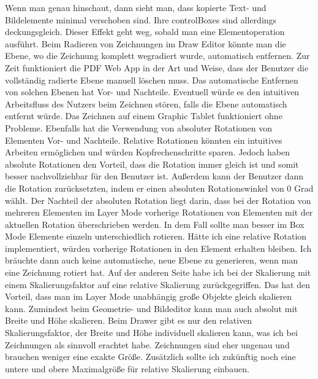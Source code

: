 Wenn man genau hinschaut, dann sieht man, dass kopierte Text- und Bildelemente minimal verschoben sind. Ihre controlBoxes sind allerdings deckungsgleich. Dieser Effekt geht weg, sobald man eine Elementoperation ausführt. Beim Radieren von Zeichnungen im Draw Editor könnte man die Ebene, wo die Zeichnung komplett wegradiert wurde, automatisch entfernen. Zur Zeit funktioniert die PDF Web App in der Art und Weise, dass der Benutzer die vollständig radierte Ebene manuell löschen muss. Das automatische Entfernen von solchen Ebenen hat Vor- und Nachteile. Eventuell würde es den intuitiven Arbeitsfluss des Nutzers beim Zeichnen stören, falls die Ebene automatisch entfernt würde. Das Zeichnen auf einem Graphic Tablet funktioniert ohne Probleme. Ebenfalls hat die Verwendung von absoluter Rotationen von Elementen Vor- und Nachteile. Relative Rotationen könnten ein intuitives Arbeiten ermöglichen und würden Kopfrechenschritte sparen. Jedoch haben absolute Rotationen den Vorteil, dass die Rotation immer gleich ist und somit besser nachvollziehbar für den Benutzer ist. Außerdem kann der Benutzer dann die Rotation zurücksetzten, indem er einen absoluten Rotationswinkel von 0 Grad wählt. Der Nachteil der absoluten Rotation liegt darin, dass bei der Rotation von mehreren Elementen im Layer Mode vorherige Rotationen von Elementen mit der aktuellen Rotation überschrieben werden. In dem Fall sollte man besser im Box Mode Elemente einzeln unterschiedlich rotieren. Hätte ich eine relative Rotation implementiert, würden vorherige Rotationen in den Element erhalten bleiben. Ich bräuchte dann auch keine automatische, neue Ebene zu generieren, wenn man eine Zeichnung rotiert hat. Auf der anderen Seite habe ich bei der Skalierung mit einem Skalierungsfaktor auf eine relative Skalierung zurückgegriffen. Das hat den Vorteil, dass man im Layer Mode unabhängig große Objekte gleich skalieren kann. Zumindest beim Geometrie- und Bildeditor kann man auch absolut mit Breite und Höhe skalieren. Beim Drawer gibt es nur den relativen Skalierungsfaktor, der Breite und Höhe individuell skalieren kann, was ich bei Zeichnungen als sinnvoll erachtet habe. Zeichnungen sind eher ungenau und brauchen weniger eine exakte Größe. Zusätzlich sollte ich zukünftig noch eine untere und obere Maximalgröße für relative Skalierung einbauen. 
\par
